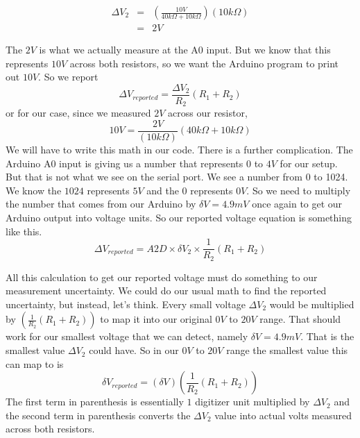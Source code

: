\begin{eqnarray*}
	\Delta V_{2} &=&\left( \frac{10\unit{V}}{40\unit{k \Omega}
	+10\unit{k\Omega}}\right) \left( 10\unit{k\Omega}\right) \\
	&=&2\unit{V}
\end{eqnarray*}

The $2\unit{V}$ is what we actually measure at the A0 input. But we know
that this represents $10\unit{V}$ across both resistors, so we want the
Arduino program to print out $10\unit{V}.$ So we report%
\begin{equation*}
\Delta V_{reported}=\frac{\Delta V_{2}}{R_{2}}\left( R_{1}+R_{2}\right)
\end{equation*}%
or for our case, since we measured $2\unit{V}$ across our resistor,%
\begin{equation*}
10\unit{V}=\frac{2\unit{V}}{\left( 10\unit{k%
\Omega%
}\right) }\left( 40\unit{k%
\Omega%
}+10\unit{k%
\Omega%
}\right)
\end{equation*}%
We will have to write this math in our code. There is a further
complication. The Arduino A0 input is giving us a number that represents $0$
to $4\unit{V}$ for our setup. But that is not what we see on the serial
port. We see a number from 0 to 1024. We know the $1024$ represents $5\unit{V%
}$ and the $0$ represents $0\unit{V}.$ So we need to multiply the number
that comes from our Arduino by $\delta V=4.9\unit{mV}$ once again to get our
Arduino output into voltage units. So our reported voltage equation is
something like this. 
\begin{equation*}
\Delta V_{reported}=A2D\times \delta V_{2}\times \frac{1}{R_{2}}\left(
R_{1}+R_{2}\right)
\end{equation*}

All this calculation to get our reported voltage must do something to our
measurement uncertainty. We could do our usual math to find the reported
uncertainty, but instead, let's think. Every small voltage $\Delta V_{2}$
would be multiplied by $\left( \frac{1}{R_{2}}\left( R_{1}+R_{2}\right)
\right) $ to map it into our original $0\unit{V}$ to $20\unit{V}$ range.
That should work for our smallest voltage that we can detect, namely $\delta
V=4.9\unit{mV}.$ That is the smallest value $\Delta V_{2}$ could have. So in
our $0\unit{V}$ to $20\unit{V}$ range the smallest value this can map to is 
\begin{equation*}
\delta V_{reported}=\left( \delta V\right) \left( \frac{1}{R_{2}}\left(
R_{1}+R_{2}\right) \right)
\end{equation*}%
The first term in parenthesis is essentially $1$ digitizer unit multiplied
by $\Delta V_{2}$ and the second term in parenthesis converts the $\Delta
V_{2}$ value into actual volts measured across both resistors.

